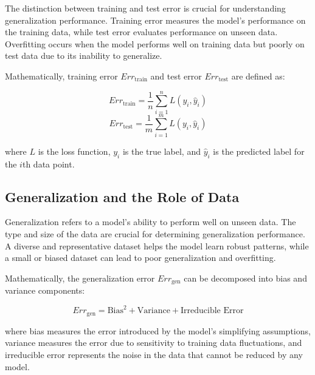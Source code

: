 \documentclass[12pt]{book} %
\begin{document}
The distinction between training and test error is crucial for understanding generalization performance. Training error measures the model's performance on the training data, while test error evaluates performance on unseen data. Overfitting occurs when the model performs well on training data but poorly on test data due to its inability to generalize.

Mathematically, training error \(Err_{\text{train}}\) and test error \(Err_{\text{test}}\) are defined as:

\[ Err_{\text{train}} = \frac{1}{n} \sum_{i=1}^{n} L(y_i, \hat{y}_i) \]
\[ Err_{\text{test}} = \frac{1}{m} \sum_{i=1}^{m} L(y_i, \hat{y}_i) \]

where \(L\) is the loss function, \(y_i\) is the true label, and \(\hat{y}_i\) is the predicted label for the \(i\)th data point.

\subsection{Generalization and the Role of Data}

Generalization refers to a model's ability to perform well on unseen data. The type and size of the data are crucial for determining generalization performance. A diverse and representative dataset helps the model learn robust patterns, while a small or biased dataset can lead to poor generalization and overfitting.

Mathematically, the generalization error \(Err_{\text{gen}}\) can be decomposed into bias and variance components:

\[ Err_{\text{gen}} = \text{Bias}^2 + \text{Variance} + \text{Irreducible Error} \]

where bias measures the error introduced by the model's simplifying assumptions, variance measures the error due to sensitivity to training data fluctuations, and irreducible error represents the noise in the data that cannot be reduced by any model.
\end{document}
